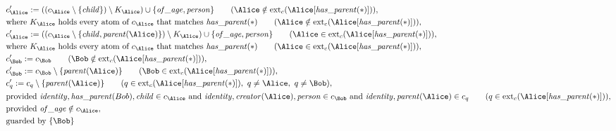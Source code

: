 \begin{align*}
&
c'_
{
\Alice
}
 := 
(
(c_
{
\Alice
}
 \setminus 
\{
\mathit{\detokenize{
child
}}
\}
) \setminus K_
{
\Alice
}
) \cup 
\{
\mathit{\detokenize{
of_age
}}
,
\mathit{\detokenize{
person
}}
\}
 \qquad (
\Alice
 \notin 
\mathrm{ext}_c(
\Alice
[
\mathit{\detokenize{
has_parent
}}
(
\ast
)
]
)
)
,\\
&
\text{where } K_
{
\Alice
}
 \text{ holds every atom of } c_
{
\Alice
}
 \text{ that matches } 
\mathit{\detokenize{
has_parent
}}
(
\ast
)
 \qquad (
\Alice
 \notin 
\mathrm{ext}_c(
\Alice
[
\mathit{\detokenize{
has_parent
}}
(
\ast
)
]
)
)
,\\
&
c'_
{
\Alice
}
 := 
(
(c_
{
\Alice
}
 \setminus 
\{
\mathit{\detokenize{
child
}}
,
\mathit{\detokenize{
parent
}}
(
\Alice
)
\}
) \setminus K_
{
\Alice
}
) \cup 
\{
\mathit{\detokenize{
of_age
}}
,
\mathit{\detokenize{
person
}}
\}
 \qquad (
\Alice
 \in 
\mathrm{ext}_c(
\Alice
[
\mathit{\detokenize{
has_parent
}}
(
\ast
)
]
)
)
,\\
&
\text{where } K_
{
\Alice
}
 \text{ holds every atom of } c_
{
\Alice
}
 \text{ that matches } 
\mathit{\detokenize{
has_parent
}}
(
\ast
)
 \qquad (
\Alice
 \in 
\mathrm{ext}_c(
\Alice
[
\mathit{\detokenize{
has_parent
}}
(
\ast
)
]
)
)
,\\
&
c'_
{
\Bob
}
 := 
c_
{
\Bob
}
 \qquad (
\Bob
 \notin 
\mathrm{ext}_c(
\Alice
[
\mathit{\detokenize{
has_parent
}}
(
\ast
)
]
)
)
,\\
&
c'_
{
\Bob
}
 := 
c_
{
\Bob
}
 \setminus 
\{
\mathit{\detokenize{
parent
}}
(
\Alice
)
\}
 \qquad (
\Bob
 \in 
\mathrm{ext}_c(
\Alice
[
\mathit{\detokenize{
has_parent
}}
(
\ast
)
]
)
)
,\\
&
c'_
q
 := 
c_
q
 \setminus 
\{
\mathit{\detokenize{
parent
}}
(
\Alice
)
\}
 \qquad (
q
 \in 
\mathrm{ext}_c(
\Alice
[
\mathit{\detokenize{
has_parent
}}
(
\ast
)
]
)
,\ 
q \neq 
\Alice
,\ 
q \neq 
\Bob
)
,\\
&
\text{provided } 
\mathit{\detokenize{
identity
}}
,
\mathit{\detokenize{
has_parent
}}
(
Bob
)
,
\mathit{\detokenize{
child
}}
 \in c_
{
\Alice
}
 \text{ and } 
\mathit{\detokenize{
identity
}}
,
\mathit{\detokenize{
creator
}}
(
\Alice
)
,
\mathit{\detokenize{
person
}}
 \in c_
{
\Bob
}
 \text{ and } 
\mathit{\detokenize{
identity
}}
,
\mathit{\detokenize{
parent
}}
(
\Alice
)
 \in c_
q
 \qquad (
q \in 
\mathrm{ext}_c(
\Alice
[
\mathit{\detokenize{
has_parent
}}
(
\ast
)
]
)
)
,\\
&
\text{provided } 
\mathit{\detokenize{
of_age
}}
 \notin c_
{
\Alice
}
,\\
&
\text{guarded by } \{
\Bob
\}
\end{align*}
